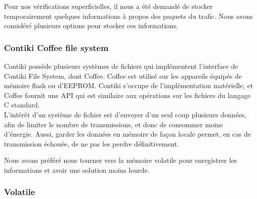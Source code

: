 		Pour nos vérifications superficielles, il nous a été demandé de stocker temporairement quelques informations à propos des paquets du trafic. Nous avons considéré plusieurs options pour stocker ces informations.

		\subsubsection{Contiki Coffee file system}
			Contiki possède plusieurs systèmes de fichiers qui implémentent l'interface de Contiki File System, dont Coffee. Coffee est utilisé sur les appareils équipés de mémoire flash ou d'EEPROM. Contiki s'occupe de l'implémentation matérielle, et Coffee fournit une API qui est similaire aux opérations sur les fichiers du langage C standard.\\
			
			L'intérêt d'un système de fichier est d'envoyer d'un seul coup plusieurs données, afin de limiter le nombre de transmissions, et donc de consommer moins d'énergie. Aussi, garder les données en mémoire de façon locale permet, en cas de transmission échouée, de ne pas les perdre définitivement.
			
			Nous avons préféré nous tourner vers la mémoire volatile pour enregistrer les informations et avoir une solution moins lourde.
		\subsubsection{Volatile}
			
